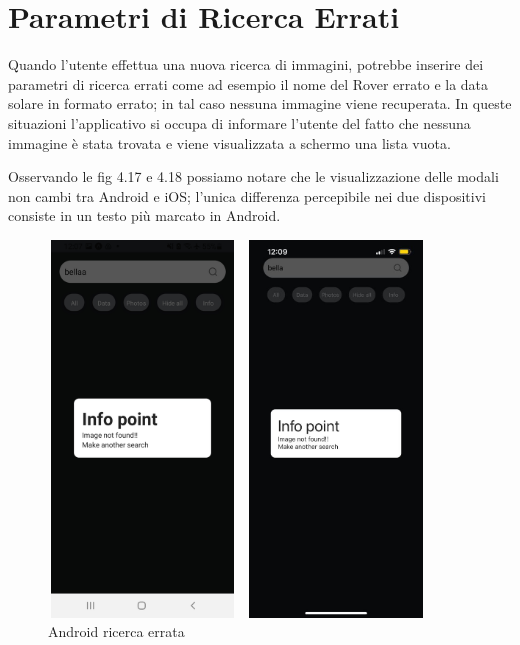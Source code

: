 \section*{Parametri di Ricerca Errati}
Quando l'utente effettua una nuova ricerca di immagini, potrebbe inserire dei parametri di ricerca errati come ad esempio il nome del Rover errato e la data solare in formato errato; 
in tal caso nessuna immagine viene recuperata. In queste situazioni l'applicativo si occupa di informare l'utente del fatto che nessuna immagine \`e
stata trovata e viene visualizzata a schermo una lista vuota.

Osservando le fig 4.17 e 4.18 possiamo notare che le visualizzazione delle modali non cambi tra Android e iOS; l'unica differenza percepibile nei due dispositivi consiste in un testo pi\`u marcato in Android.
\begin{figure}[h]
    \begin{minipage}[h]{0.47\textwidth}
        \centering
        \includegraphics[width=5cm, height=10cm]{images/immaginiAndroid/ricercaErrata.jpg}
        \caption{\label{ricercaErrataAndroid} Android ricerca errata}
    \end{minipage}
    \hfill
    \begin{minipage}[h]{0.47\textwidth}
        \centering
        \includegraphics[width=5cm, height=10cm]{images/immaginiPhone/ricercaErrata.jpeg}

\end{minipage}
\end{figure}
